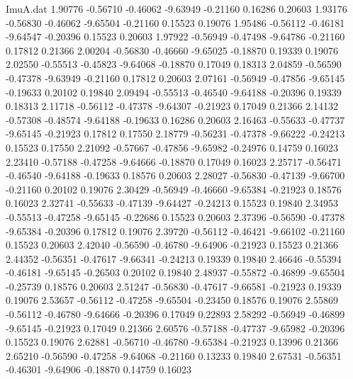 \begin{filecontents}{ImuA.dat}
   1.90776   -0.56710   -0.46062   -9.63949   -0.21160    0.16286    0.20603
   1.93176   -0.56830   -0.46062   -9.65504   -0.21160    0.15523    0.19076
   1.95486   -0.56112   -0.46181   -9.64547   -0.20396    0.15523    0.20603
   1.97922   -0.56949   -0.47498   -9.64786   -0.21160    0.17812    0.21366
   2.00204   -0.56830   -0.46660   -9.65025   -0.18870    0.19339    0.19076
   2.02550   -0.55513   -0.45823   -9.64068   -0.18870    0.17049    0.18313
   2.04859   -0.56590   -0.47378   -9.63949   -0.21160    0.17812    0.20603
   2.07161   -0.56949   -0.47856   -9.65145   -0.19633    0.20102    0.19840
   2.09494   -0.55513   -0.46540   -9.64188   -0.20396    0.19339    0.18313
   2.11718   -0.56112   -0.47378   -9.64307   -0.21923    0.17049    0.21366
   2.14132   -0.57308   -0.48574   -9.64188   -0.19633    0.16286    0.20603
   2.16463   -0.55633   -0.47737   -9.65145   -0.21923    0.17812    0.17550
   2.18779   -0.56231   -0.47378   -9.66222   -0.24213    0.15523    0.17550
   2.21092   -0.57667   -0.47856   -9.65982   -0.24976    0.14759    0.16023
   2.23410   -0.57188   -0.47258   -9.64666   -0.18870    0.17049    0.16023
   2.25717   -0.56471   -0.46540   -9.64188   -0.19633    0.18576    0.20603
   2.28027   -0.56830   -0.47139   -9.66700   -0.21160    0.20102    0.19076
   2.30429   -0.56949   -0.46660   -9.65384   -0.21923    0.18576    0.16023
   2.32741   -0.55633   -0.47139   -9.64427   -0.24213    0.15523    0.19840
   2.34953   -0.55513   -0.47258   -9.65145   -0.22686    0.15523    0.20603
   2.37396   -0.56590   -0.47378   -9.65384   -0.20396    0.17812    0.19076
   2.39720   -0.56112   -0.46421   -9.66102   -0.21160    0.15523    0.20603
   2.42040   -0.56590   -0.46780   -9.64906   -0.21923    0.15523    0.21366
   2.44352   -0.56351   -0.47617   -9.66341   -0.24213    0.19339    0.19840
   2.46646   -0.55394   -0.46181   -9.65145   -0.26503    0.20102    0.19840
   2.48937   -0.55872   -0.46899   -9.65504   -0.25739    0.18576    0.20603
   2.51247   -0.56830   -0.47617   -9.66581   -0.21923    0.19339    0.19076
   2.53657   -0.56112   -0.47258   -9.65504   -0.23450    0.18576    0.19076
   2.55869   -0.56112   -0.46780   -9.64666   -0.20396    0.17049    0.22893
   2.58292   -0.56949   -0.46899   -9.65145   -0.21923    0.17049    0.21366
   2.60576   -0.57188   -0.47737   -9.65982   -0.20396    0.15523    0.19076
   2.62881   -0.56710   -0.46780   -9.65384   -0.21923    0.13996    0.21366
   2.65210   -0.56590   -0.47258   -9.64068   -0.21160    0.13233    0.19840
   2.67531   -0.56351   -0.46301   -9.64906   -0.18870    0.14759    0.16023

\end{filecontents}
